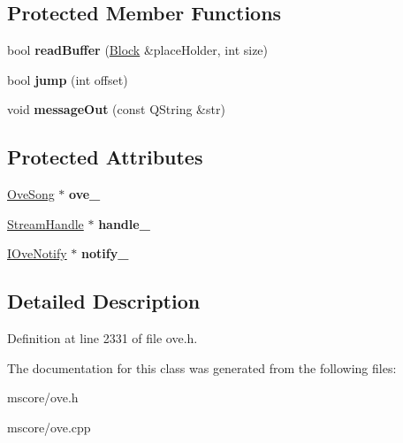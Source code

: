 \subsection*{Protected Member Functions}
\begin{DoxyCompactItemize}
\item 
\mbox{\label{class_o_v_e_1_1_basic_parse_aec96fd8e9126c697b5d504ccdbbde34a}} 
bool {\bfseries read\+Buffer} (\hyperlink{class_o_v_e_1_1_block}{Block} \&place\+Holder, int size)
\item 
\mbox{\label{class_o_v_e_1_1_basic_parse_a398f779c37a2e8b5268997a507461b59}} 
bool {\bfseries jump} (int offset)
\item 
\mbox{\label{class_o_v_e_1_1_basic_parse_a2d7847e9e51f6e21f0eea0176a9ae18e}} 
void {\bfseries message\+Out} (const Q\+String \&str)
\end{DoxyCompactItemize}
\subsection*{Protected Attributes}
\begin{DoxyCompactItemize}
\item 
\mbox{\label{class_o_v_e_1_1_basic_parse_ab2406aa4b115609a043f4afe92d81152}} 
\hyperlink{class_o_v_e_1_1_ove_song}{Ove\+Song} $\ast$ {\bfseries ove\+\_\+}
\item 
\mbox{\label{class_o_v_e_1_1_basic_parse_a22d0065efcde40d4e6fa17063ae8025c}} 
\hyperlink{class_o_v_e_1_1_stream_handle}{Stream\+Handle} $\ast$ {\bfseries handle\+\_\+}
\item 
\mbox{\label{class_o_v_e_1_1_basic_parse_a0f6b76291e4cb443183ab38b21c454b5}} 
\hyperlink{class_o_v_e_1_1_i_ove_notify}{I\+Ove\+Notify} $\ast$ {\bfseries notify\+\_\+}
\end{DoxyCompactItemize}


\subsection{Detailed Description}


Definition at line 2331 of file ove.\+h.



The documentation for this class was generated from the following files\+:\begin{DoxyCompactItemize}
\item 
mscore/ove.\+h\item 
mscore/ove.\+cpp\end{DoxyCompactItemize}

